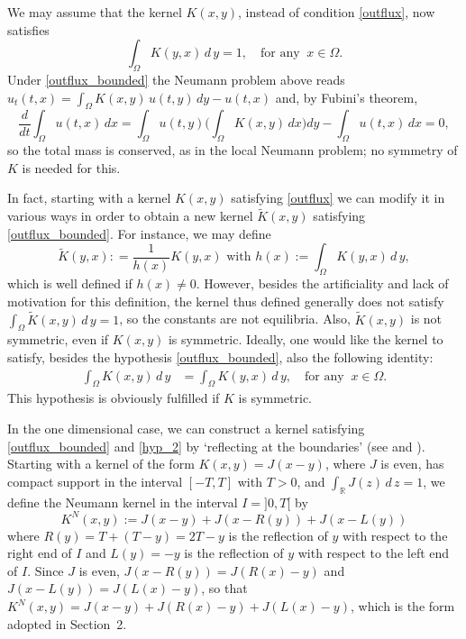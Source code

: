 \documentclass[a4paper,12pt]{amsart}
\newcommand{\R}{\mathbb{R}}
\newcommand{\dis}{\displaystyle}
\begin{document}
   We may assume that the kernel $ \dis    K(x,y)   $, instead of  condition \eqref{outflux}, now satisfies
   \begin{equation} \label{outflux_bounded} \int_{\Omega} K(y,x) \, d\,y = 1, \quad \textrm{for any }  \ x \in \Omega.
     \end{equation}
{Under \eqref{outflux_bounded} the Neumann problem above reads $u_t(t,x) = \int_\Omega K(x,y)\,u(t,y)\,dy - u(t,x)$ and, by Fubini's theorem,
\[
\frac{d}{dt}\int_\Omega u(t,x)\,dx = \int_\Omega u(t,y)\Big(\int_\Omega K(x,y)\,dx\Big)dy - \int_\Omega u(t,x)\,dx = 0,
\]
so the total mass is conserved, as in the local Neumann problem; no symmetry of $K$ is needed for this.}

   In fact, starting with a kernel $ \dis    K(x,y)   $ satisfying    \eqref{outflux} we can
    modify it in various ways  in order to obtain a new {kernel}
    $ \dis    {\tilde{K}(x,y)}   $ satisfying \eqref{outflux_bounded}.  For instance, we may  define
      \begin{equation}
       \label{modify_kernel1}
      \tilde{K}(y,x)  : =  \frac{1}{h(x)} K(y,x)  \textrm{ with }  h(x) :=
       \int_{\Omega} K(y,x) \, d\, y,
     \end{equation}
     which is well defined if $ h(x) \neq 0$.
     However, besides the artificiality and lack of motivation for this definition,  the kernel  thus defined generally  does not  satisfy
          $ \displaystyle  \int_{\Omega}   \tilde{K}(x,y)  \,  d\,y
      = 1 $, so the constants are not equilibria.  Also,  $\dis \tilde{K}(x,y) $ is not   symmetric, even if
  $\dis {K}(x,y) $  is symmetric. Ideally, one would like the kernel
  to satisfy, besides the hypothesis \eqref{outflux_bounded}, also the following  identity:
  \begin{align}
    \int_{\Omega} K(x,y) \, d\,y & =  \int_{\Omega} K(y,x) \, d\,y , \quad \textrm{for any }  \ x \in \Omega. \label{hyp_2}
  \end{align}
  This hypothesis is obviously fulfilled if $K$ is symmetric.

   In the one dimensional case, we  can construct a  kernel satisfying \eqref{outflux_bounded} and \eqref{hyp_2} by `reflecting at the boundaries'
    (see \cite{hutson} and  \cite{belletini}).
  Starting with a kernel  of the form $K(x,y) = J(x-y)$, where $J $ is even, has compact support in the  interval $[-T,T]$ { with $T>0$}, and
      $ \dis \int_{\R}J (z) \, d\,z =1$,
        we define  the Neumann kernel in the interval{ $ I=]0,T[$ } by
\[ K^{N}(x,y)  :=  J(x-y) +   J(x-R(y)) +  J(x- L (y)) \]
   where $ R(y)= T +( T-y) = 2 T-y $  is the reflection of $y$  with respect to the right end of $I$   and
  $ L(y)= -y$    is the reflection of $y$  with respect to the left end of $I$.
  {Since $J$ is even, $J(x-R(y)) = J(R(x)-y)$ and $J(x-L(y)) = J(L(x)-y)$, so that
  $K^N(x,y) = J(x-y) + J(R(x)-y) + J(L(x)-y)$, which is the form adopted in Section~2.}
\end{document}
